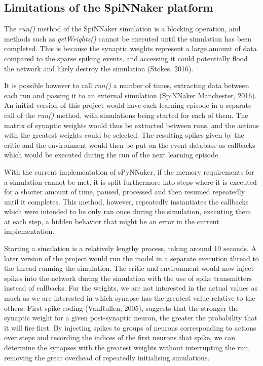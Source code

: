 \documentclass[10pt]{article}
\begin{document}
    \subsection{Limitations of the SpiNNaker platform}

    The \textit{run()} method of the SpiNNaker simulation is a blocking operation, and methods such as \textit{getWeights()} cannot be executed until the simulation has been completed. This is because the synaptic weights represent a large amount of data compared to the sparse spiking events, and accessing it could potentially flood the network and likely destroy the simulation (Stokes, 2016).

    It is possible however to call \textit{run()} a number of times, extracting data between each run and passing it to an external simulation (SpiNNaker Manchester, 2016). An initial version of this project would have each learning episode in a separate call of the \textit{run()} method, with simulations being started for each of them. The matrix of synaptic weights would thus be extracted between runs, and the actions with the greatest weights could be selected. The resulting spikes given by the critic and the environment would then be put on the event database as callbacks which would be executed during the run of the next learning episode.
    
    With the current implementation of sPyNNaker, if the memory requirements for a simulation cannot be met, it is split furthermore into steps where it is executed for a shorter amount of time, paused, processed and then resumed repeatedly until it completes. This method, however, repeatedly instantiates the callbacks which were intended to be only ran once during the simulation, executing them at each step, a hidden behavior that might be an error in the current implementation.
    
    Starting a simulation is a relatively lengthy process, taking around 10 seconds. A later version of the project would run the model in a separate execution thread to the thread running the simulation. The critic and environment would now inject spikes into the network during the simulation with the use of spike transmitters instead of callbacks. For the weights, we are not interested in the actual values as much as we are interested in which synapse has the greatest value relative to the others. First spike coding (VanRullen, 2005), suggests that the stronger the synaptic weight for a given post-synaptic neuron, the greater the probability that it will fire first. By injecting spikes to groups of neurons corresponding to actions over steps and recording the indices of the first neurons that spike, we can determine the synapses with the greatest weights without interrupting the run, removing the great overhead of repeatedly initialising simulations.
\end{document}
